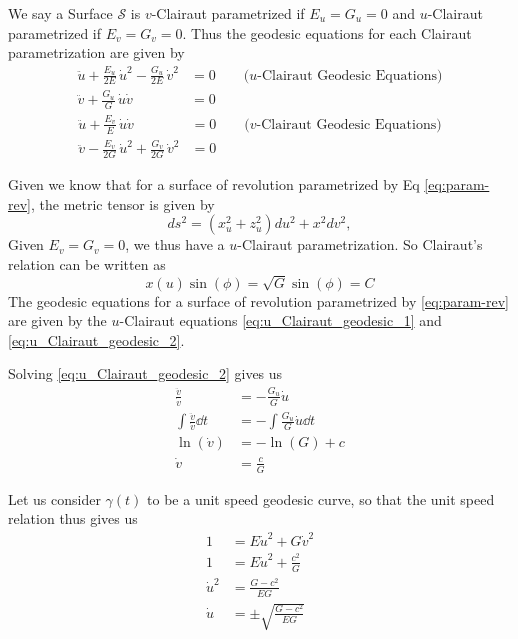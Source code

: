 \documentclass[12pt]{article}
\begin{document}
We say a Surface $\mathcal{S}$ is $v$-Clairaut parametrized if $E_{u} = G_{u} = 0$ and $u$-Clairaut parametrized if $E_{v} = G_{v} = 0$.
Thus the geodesic equations for each Clairaut parametrization are given by
\begin{align}
    \ddot{u} + \frac{E_{u}}{2E}\,\dot{u}^2 - \frac{G_{u}}{2E}\,\dot{v}^{2} &= 0 \qquad (u\text{-Clairaut Geodesic Equations)} \label{eq:u_Clairaut_geodesic_1}\\
    \ddot{v} + \frac{G_{u}}{G}\,\dot{u}\dot{v} &= 0 \label{eq:u_Clairaut_geodesic_2}
\end{align}
\begin{align}
    \ddot{u} + \frac{E_{v}}{E}\,\dot{u}\dot{v} &= 0 \qquad (v\text{-Clairaut Geodesic Equations)} \label{eq:v_Clairaut_geodesic_1}\\
    \ddot{v} - \frac{E_{v}}{2G}\,\dot{u}^2 + \frac{G_{v}}{2G}\,\dot{v}^2 &= 0 \label{eq:v_Clairaut_geodesic_2}
\end{align}

Given we know that for a surface of revolution parametrized by Eq \eqref{eq:param-rev}, the metric tensor is given by
\[
    ds^2 = \left( x_{u}^2 + z_u^2 \right) du^2 + x^2 dv^2,
\]
Given $E_v = G_v = 0$, we thus have a $u$-Clairaut parametrization.
So Clairaut's relation can be written as
\begin{equation} \label{eq:Clairaut_relation_u}
    x(u) \sin(\phi) = \sqrt{G} \sin(\phi) = C
\end{equation}
The geodesic equations for a surface of revolution parametrized by \eqref{eq:param-rev} are given by the $u$-Clairaut equations \eqref{eq:u_Clairaut_geodesic_1} and \eqref{eq:u_Clairaut_geodesic_2}.

Solving \eqref{eq:u_Clairaut_geodesic_2} gives us
\begin{align*}
    \frac{\ddot{v}}{\dot{v}} &= -\frac{G_{u}}{G}\dot{u} \\
    \int \frac{\ddot{v}}{\dot{v}} \dd{t} &= -\int \frac{G_{u}}{G}\dot{u} \dd{t} \\
    \ln(\dot{v}) &= -\ln(G) + c \\
    \dot{v} &= \frac{c}{G}
\end{align*}

Let us consider $\gamma(t)$ to be a unit speed geodesic curve, so that the unit speed relation thus gives us
\begin{align*}
    1 &= E \dot{u}^2 + G \dot{v}^2 \\
    1 &= E \dot{u}^2 + \frac{c^2}{G} \\
    \dot{u}^2 &= \frac{G - c^2}{EG} \\
    \dot{u} &= \pm \sqrt{\frac{G - c^2}{EG}} \\
\end{align*}
\end{document}

